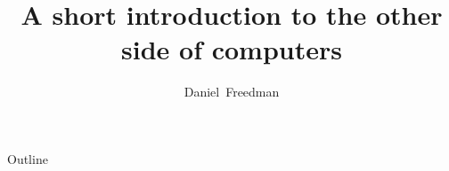 \documentclass{beamer}
\title[Getting Comfortable With the Commandline]
{A short introduction to the other side of computers}
\author[Author]
{Daniel~Freedman}
\institute[Association for Computing Machinery]
\date[September 14th, 2010]
\begin{document}
\begin{frame}
  \titlepage
\end{frame}

\begin{frame}{Outline}
  \tableofcontents
\end{frame}
\end{document}
